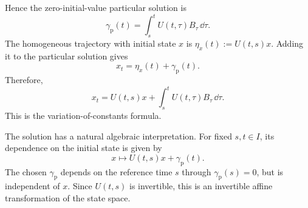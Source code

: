 \documentclass[12pt,a4paper,oneside]{book}
\begin{document}
\begin{example}
\begin{solution}
Hence the zero-initial-value particular solution is
\begin{equation*}
    \gamma_{\mathrm p}(t) = \int_s^t U(t,\tau)B_{\tau}\,\dd\tau.
\end{equation*}
The homogeneous trajectory with initial state $x$ is $\eta_x(t):=U(t,s)x$. Adding it to the particular solution gives
\begin{equation*}
    x_t=\eta_x(t)+\gamma_{\mathrm p}(t).
\end{equation*}
Therefore,
\begin{equation}
    \boxed{
        x_t=U(t,s)x + \int_s^t U(t,\tau)B_{\tau}\,\dd\tau.
    }
    \label{eq:variation-constants}
\end{equation}
This is the variation-of-constants formula.


The solution has a natural algebraic interpretation. For fixed $s,t\in I$, its dependence on the initial state is given by
\begin{equation*}
    x\longmapsto U(t,s)x+\gamma_{\mathrm p}(t).
\end{equation*}
The chosen $\gamma_{\mathrm p}$ depends on the reference time $s$ through $\gamma_{\mathrm p}(s)=0$, but is independent of $x$. Since $U(t,s)$
is invertible, this is an invertible affine transformation of the state space.


\end{solution}
\end{example}
\end{document}
